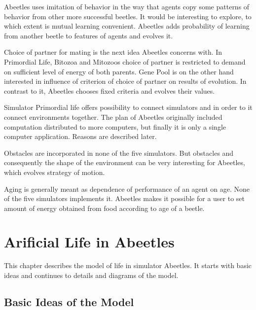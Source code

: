 \documentclass[a4paper,12pt]{report}
\begin{document}
Abeetles uses imitation of behavior in the way that agents copy some patterns of behavior from other more successful beetles. It would be interesting to explore, to which extent is mutual learning convenient. Abeetles adds probability of learning from another beetle to features of agents and evolves it.

Choice of partner for mating is the next idea Abeetles concerns with. In Primordial Life, Bitozoa and Mitozoos choice of partner is restricted to demand on sufficient level of energy of both parents. Gene Pool is on the other hand interested in influence of criterion of choice of partner on results of evolution. \cite{GenePool2} In contrast to it, Abeetles chooses fixed criteria and evolves their values.   

Simulator Primordial life offers possibility to connect simulators and in order to it connect environments together. The plan of Abeetles originally included computation distributed to more computers, but finally it is only a single computer application. Reasons are described later. 

Obstacles are incorporated in none of the five simulators. But obstacles and consequently the shape of the environment can be very interesting for Abeetles, which evolves strategy of motion.  

Aging is generally meant as dependence of performance of an agent on age. None of the five simulators implements it. Abeetles makes it possible for a user to set amount of energy obtained from food according to age of a beetle.


\chapter {Arificial Life in Abeetles}

This chapter describes the model of life in simulator Abeetles. It starts with basic ideas and continues to details and diagrams of the model.  

\section {Basic Ideas of the Model}
\end{document}
